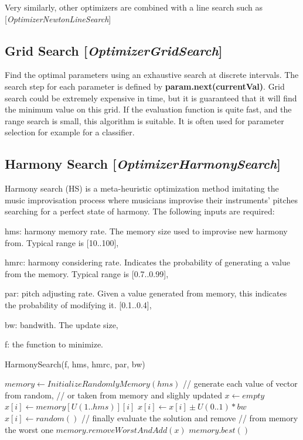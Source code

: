 \documentclass[11pt]{article}
\newcommand{\nllref}[1]{[\small{\textit{#1}}]}
\begin{document}
Very similarly, other optimizers are combined with a line search such as
\nllref{OptimizerNewtonLineSearch}

\subsection{Grid Search \nllref{OptimizerGridSearch}}
Find the optimal parameters using an exhaustive search at discrete intervals. The search step for each parameter is defined
by \textbf{param.next(currentVal)}. Grid search could be extremely expensive in time, but it is guaranteed that it will find the minimum
value on this grid. If the evaluation function is quite fast, and the range search is small, this algorithm is suitable. It is often used for parameter selection for example for a classifier.

\subsection{Harmony Search \nllref{OptimizerHarmonySearch}}
Harmony search (HS) is a meta-heuristic optimization method imitating the music improvisation process where
musicians improvise their instruments' pitches searching for a perfect state of harmony. The following inputs are required:
\begin{compactitem}
\item hms: harmony memory rate. The memory size used to improvise new harmony from. Typical range is [10..100],
\item hmrc: harmony considering rate. Indicates the probability of generating a value from the memory. Typical range is [0.7..0.99],
\item par: pitch adjusting rate. Given a value generated from memory, this indicates the probability of modifying it. [0.1..0.4],
\item bw: bandwith. The update size,
\item f: the function to minimize.
\end{compactitem}

\begin{algorithm}
\caption{HarmonySearch(f, hms, hmrc, par, bw)}
\begin{algorithmic}
\STATE $memory \leftarrow InitializeRandomlyMemory(hms)$
\STATE // generate each value of vector from random,
\STATE // or taken from memory and slighly updated
\STATE $x \leftarrow empty$
\STATE $x[i] \leftarrow memory[U(1..hms)][i]$
\STATE $x[i] \leftarrow x[i] \pm U(0..1) * bw$
\ENDIF
\ELSE
\STATE $x[i] \leftarrow random()$
\ENDIF
\ENDFOR
\STATE // finally evaluate the solution and remove
\STATE // from memory the worst one
\STATE $memory.removeWorstAndAdd(x)$
\ENDIF
\ENDWHILE
\RETURN $memory.best()$

\end{algorithmic}
\end{algorithm}
\end{document}
